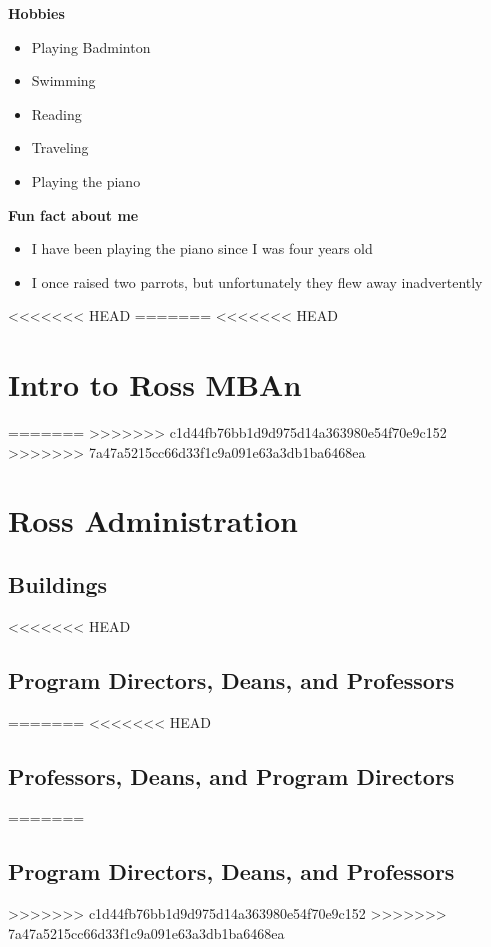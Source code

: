 \documentclass[
]{book}
\begin{document}
\textbf{Hobbies}

\begin{itemize}
\item
  Playing Badminton
\item
  Swimming
\item
  Reading
\item
  Traveling
\item
  Playing the piano
\end{itemize}

\textbf{Fun fact about me}

\begin{itemize}
\item
  I have been playing the piano since I was four years old
\item
  I once raised two parrots, but unfortunately they flew away inadvertently
\end{itemize}

<<<<<<< HEAD
=======
<<<<<<< HEAD
\hypertarget{intro-to-ross-mban}{%
\chapter{Intro to Ross MBAn}\label{intro-to-ross-mban}}

=======
>>>>>>> c1d44fb76bb1d9d975d14a363980e54f70e9c152
>>>>>>> 7a47a5215cc66d33f1c9a091e63a3db1ba6468ea
\hypertarget{ross-administration}{%
\chapter{Ross Administration}\label{ross-administration}}

\hypertarget{buildings}{%
\section{Buildings}\label{buildings}}

<<<<<<< HEAD
\hypertarget{program-directors-deans-and-professors}{%
\section{Program Directors, Deans, and Professors}\label{program-directors-deans-and-professors}}
=======
<<<<<<< HEAD
\hypertarget{professors-deans-and-program-directors}{%
\section{Professors, Deans, and Program Directors}\label{professors-deans-and-program-directors}}
=======
\hypertarget{program-directors-deans-and-professors}{%
\section{Program Directors, Deans, and Professors}\label{program-directors-deans-and-professors}}
>>>>>>> c1d44fb76bb1d9d975d14a363980e54f70e9c152
>>>>>>> 7a47a5215cc66d33f1c9a091e63a3db1ba6468ea
\end{document}
